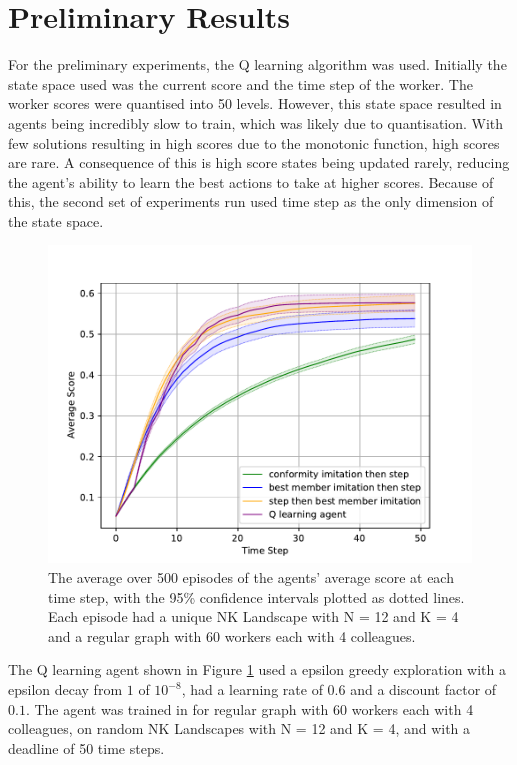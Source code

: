 \documentclass[conference]{IEEEtran}
\begin{document}
\section{Preliminary Results}\label{results}

For the preliminary experiments,
the Q learning algorithm \cite{qlearning} was used.
Initially the state space used was the current score
and the time step of the worker.
The worker scores were quantised into 50 levels.
However, this state space resulted in agents being incredibly slow to train,
which was likely due to quantisation.
With few solutions resulting in high scores due to the monotonic function,
high scores are rare.
A consequence of this is high score states being updated rarely,
reducing the agent's ability to learn the best actions to take at higher scores.
Because of this, the second set of experiments run used time step
as the only dimension of the state space.

\begin{figure}[htbp]
    \centering
    \centerline{\includegraphics[scale=0.58]{figures/version4.pdf}}
    \caption{
        The average over 500 episodes of the agents' average score
        at each time step, with the 95\% confidence intervals
        plotted as dotted lines.
        Each episode had a unique NK Landscape with N = 12 and K = 4
        and a regular graph with 60 workers each with 4 colleagues.
    }
    \label{avscore}
\end{figure}

The Q learning agent shown in Figure \ref{avscore}
used a epsilon greedy exploration with a epsilon decay from $1$ of $10^{-8}$,
had a learning rate of $0.6$ and a discount factor of $0.1$.
The agent was trained in for regular graph with 60 workers
each with 4 colleagues, on random NK Landscapes with N = 12 and K = 4,
and with a deadline of 50 time steps.
\end{document}
